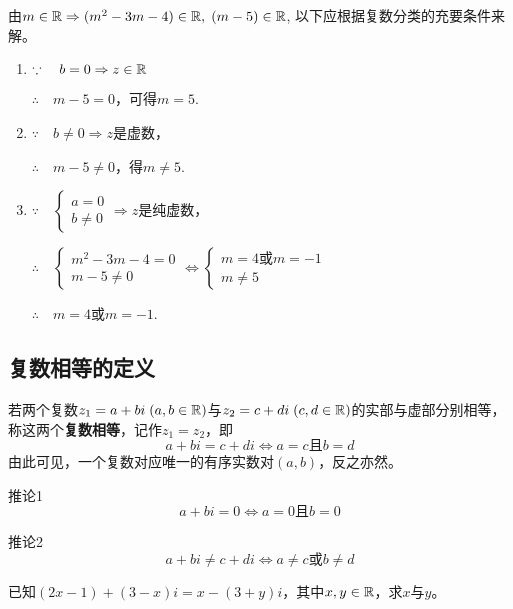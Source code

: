 \begin{analyze}
由$m\in\mathbb{R} \Rightarrow (m^2-3m-4)\in\mathbb{R},\; (m-5)\in\mathbb{R}$, 以下应根据复数分类的充要条件来解。
\end{analyze}

\begin{solution}
\begin{enumerate}[(1)]
    \item $\because\quad b=0\Rightarrow z\in\mathbb{R}$
    
$\therefore\quad  m-5=0$，可得$m=5$.
    \item $\because\quad b\ne 0\Rightarrow z$是虚数，
    
$\therefore\quad m-5\ne 0$，得$m\ne 5$.
    \item $\because\quad \begin{cases}
        a=0\\ b\ne 0
    \end{cases} \Rightarrow z$是纯虚数，

$\therefore\quad  \begin{cases}
    m^2-3m-4=0\\m-5\ne 0
\end{cases}\Longleftrightarrow \begin{cases}
    m=4\text{或}m=-1\\
    m\ne 5
\end{cases}$

$\therefore\quad m=4$或$m=-1$.
\end{enumerate}

\end{solution}

\subsection{复数相等的定义}
若两个复数$z_1=a+bi\; (a,b\in\mathbb{R})$与$z_2=c+di\; (c,d\in\mathbb{R})$的实部与虚部分别相等，称这两个\textbf{复数相等}，记作$z_1=z_2$，即
\[a+bi=c+di  \Longleftrightarrow a=c\text{且}b=d\]
由此可见，一个复数对应唯一的有序实数对$(a,b)$，反之亦然。

\begin{thm}
{推论1} \[a+bi=0\Longleftrightarrow a=0\text{且}b=0\]
\end{thm}

\begin{thm}
{推论2}\[a+bi\ne c+di\Longleftrightarrow a\ne c\text{或}b\ne d\]
\end{thm}

\begin{example}
    已知$(2x-1)+(3-x)i=x-(3+y)i$，其中$x,y\in\mathbb{R}$，求$x$与$y$。
\end{example}


